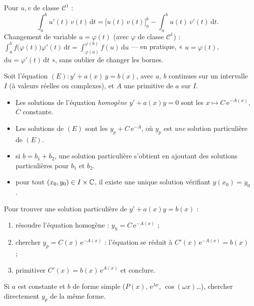 \begin{theoreme}
Pour $u,v$ de classe $\mathscr{C}^{1}$ :
\[
  \int_{a}^{b}u'(t)\,v(t)\,\mathrm{d}t
  =\bigl[u(t)\,v(t)\bigr]_{a}^{b}-\int_{a}^{b}u(t)\,v'(t)\,\mathrm{d}t.
\]
Changement de variable $u=\varphi(t)$ (avec $\varphi$ de classe $\mathscr{C}^{1}$) :
$\displaystyle\int_{a}^{b}f\bigl(\varphi(t)\bigr)\varphi'(t)\,\mathrm{d}t
=\int_{\varphi(a)}^{\varphi(b)}f(u)\,\mathrm{d}u$ —
en pratique, « $u=\varphi(t)$, $\mathrm{d}u=\varphi'(t)\,\mathrm{d}t$ », sans
oublier de changer les bornes.
\end{theoreme}


\begin{theoreme}
Soit l'équation $(E):y'+a(x)\,y=b(x)$, avec $a$, $b$ continues sur un
intervalle $I$ (à valeurs réelles ou complexes), et $A$ une primitive de $a$
sur $I$.
\begin{itemize}[label={\color{otNavy}\textbullet},leftmargin=1.4em,itemsep=0.6mm,topsep=0.8mm]
  \item Les solutions de l'équation \emph{homogène} $y'+a(x)y=0$ sont les
    $x\mapsto C\,\mathrm{e}^{-A(x)}$, $C$ constante.
  \item Les solutions de $(E)$ sont les $y_p+C\,\mathrm{e}^{-A}$, où $y_p$ est
    \emph{une} solution particulière de $(E)$.
  \item {} si $b=b_1+b_2$, une solution particulière
    s'obtient en ajoutant des solutions particulières pour $b_1$ et $b_2$.
  \item {} pour tout $(x_0,y_0)\in I\times\mathbb{C}$, il existe une
    unique solution vérifiant $y(x_0)=y_0$.
\end{itemize}
\end{theoreme}

\begin{savoirfaire}
Pour trouver une solution particulière de $y'+a(x)y=b(x)$ :
\begin{enumerate}[label=\otLabel{\arabic*.},leftmargin=1.6em,itemsep=0.6mm,topsep=0.5mm]
  \item résoudre l'équation homogène : $y_h=C\,\mathrm{e}^{-A(x)}$ ;
  \item chercher $y_p=C(x)\,\mathrm{e}^{-A(x)}$ : l'équation se réduit à
    $C'(x)\,\mathrm{e}^{-A(x)}=b(x)$ ;
  \item primitiver $C'(x)=b(x)\,\mathrm{e}^{A(x)}$ et conclure.
\end{enumerate}
Si $a$ est constante et $b$ de forme simple ($P(x)$, $\mathrm{e}^{\lambda x}$,
$\cos(\omega x)$\dots), chercher directement $y_p$ de la même forme.
\end{savoirfaire}

